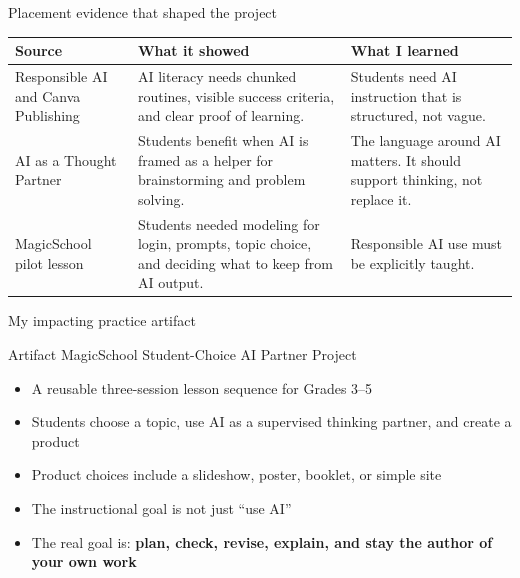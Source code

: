 \documentclass[aspectratio=169,11pt]{beamer}
\begin{document}
\begin{frame}{Placement evidence that shaped the project}
\small
\begin{tabularx}{\textwidth}{@{}p{3.4cm}YY@{}}
\toprule
\textbf{Source} & \textbf{What it showed} & \textbf{What I learned} \\
\midrule
Responsible AI and Canva Publishing & AI literacy needs chunked routines, visible success criteria, and clear proof of learning. & Students need AI instruction that is structured, not vague. \\
\addlinespace
AI as a Thought Partner & Students benefit when AI is framed as a helper for brainstorming and problem solving. & The language around AI matters. It should support thinking, not replace it. \\
\addlinespace
MagicSchool pilot lesson & Students needed modeling for login, prompts, topic choice, and deciding what to keep from AI output. & Responsible AI use must be explicitly taught. \\
\bottomrule
\end{tabularx}
\end{frame}

\begin{frame}{My impacting practice artifact}
\begin{block}{Artifact}
\Large MagicSchool Student-Choice AI Partner Project
\end{block}

\vspace{0.25cm}
\begin{itemize}
  \item A reusable three-session lesson sequence for Grades 3--5
  \item Students choose a topic, use AI as a supervised thinking partner, and create a product
  \item Product choices include a slideshow, poster, booklet, or simple site
  \item The instructional goal is not just ``use AI''
  \item The real goal is: \textbf{plan, check, revise, explain, and stay the author of your own work}
\end{itemize}
\end{frame}
\end{document}
